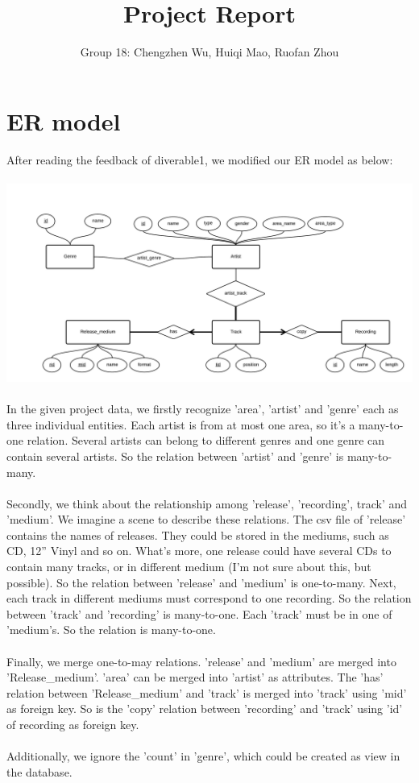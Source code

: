 \documentclass[11pt]{article} %
\title{Project Report}
\author{Group 18: Chengzhen Wu, Huiqi Mao, Ruofan Zhou}
\begin{document}
\maketitle

\section{ER model}
After reading the feedback of diverable1, we modified our ER model as below:\\ \\
\includegraphics[width=14cm]{ERmodel}\\ \\
In the given project data, we firstly recognize 'area', 'artist' and 'genre' each as three individual entities. Each artist is from at most one area, so it's a many-to-one relation. Several artists can belong to different genres and one genre can contain several artists. So the relation between 'artist' and 'genre' is many-to-many.\\ \\
Secondly, we think about the relationship among 'release', 'recording', track' and 'medium'. We imagine a scene to describe these relations. The csv file of 'release' contains the names of releases. They could be stored in the mediums, such as CD, 12” Vinyl and so on. What's more, one release could have several CDs to contain many tracks, or in different medium (I'm not sure about this, but possible). So the relation between 'release' and 'medium' is one-to-many. Next, each track in different mediums must correspond to one recording. So the relation between 'track' and 'recording' is many-to-one. Each 'track' must be in one of 'medium's. So the relation is many-to-one.\\ \\
Finally, we merge one-to-may relations. 'release' and 'medium' are merged into 'Release\_medium'.  'area' can be merged into 'artist' as attributes. The 'has' relation between 'Release\_medium' and 'track' is merged into 'track' using 'mid' as foreign key. So is the 'copy' relation between 'recording' and 'track' using 'id' of recording as foreign key.\\ \\
Additionally, we ignore the 'count' in 'genre', which could be created as view in the database.\\ \\
\end{document}
